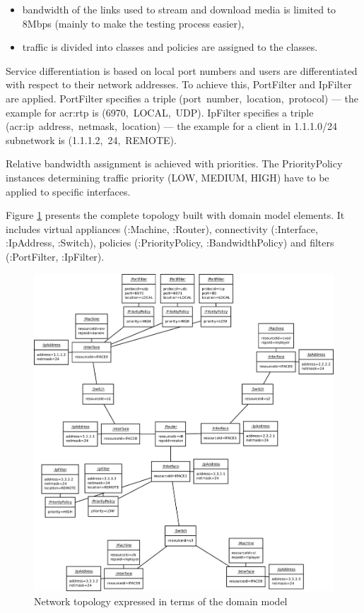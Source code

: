 \documentclass[11pt]{book}
\begin{document}
        \begin{itemize}
          \item bandwidth of the links used to stream and download media is limited to 8Mbps (mainly to make the
                testing process easier),
          \item traffic is divided into classes and policies are assigned to the classes.
        \end{itemize}

        Service differentiation is based on local port numbers and users are differentiated with respect to their
        network addresses. To achieve this, PortFilter and IpFilter are applied. PortFilter specifies a triple
        \mbox{(port number, location, protocol)} --- the example for \gls{acr:rtp} is \mbox{(6970, LOCAL, UDP)}. IpFilter
        specifies a triple \mbox{(\gls{acr:ip} address, netmask, location)} --- the example for a client in 1.1.1.0/24 subnetwork
        is \mbox{(1.1.1.2, 24, REMOTE)}.

        Relative bandwidth assignment is achieved with priorities. The PriorityPolicy instances determining traffic
        priority (LOW, MEDIUM, HIGH) have to be applied to specific interfaces.

        Figure \ref{fig:cs:topo} presents the complete topology built with domain model elements. It includes virtual
        appliances (:Machine, :Router), connectivity (:Interface, :IpAddress, :Switch), policies (:PriorityPolicy,
        :BandwidthPolicy) and filters (:PortFilter, :IpFilter).

        \begin{figure}[H]
          \includegraphics[width=.9\textwidth]{img/test-case/topology-om.pdf}

          \caption{Network topology expressed in terms of the domain model}
          \label{fig:cs:topo}
        \end{figure}
\end{document}
